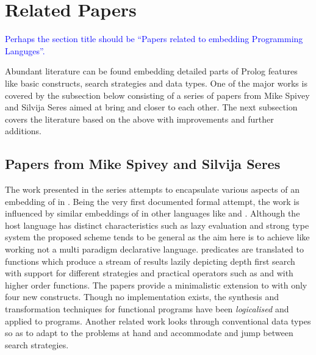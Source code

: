\documentclass[thesis-solanki.tex]{subfiles}
\begin{document}
\section{Related Papers}
\textcolor{blue}{Perhaps the section title should be ``Papers related to embedding Programming Languges''.}

Abundant literature
can be found  embedding detailed parts of Prolog features
like basic constructs, search strategies and data types.
One of the major works is covered by the subsection below consisting of a series of papers from Mike Spivey and
Silvija Seres aimed at bring  and  closer to each other.
The next subsection covers the literature based on the above
with improvements and further additions.


\subsection{Papers from Mike Spivey and Silvija Seres}


The work presented in the series
\cite{spivey1999embedding,seres1999algebra,seres2001higher,spivey1999algebra,seres2001algebra} attempts to
encapsulate various aspects of an embedding of  in .
Being the very first documented formal attempt, the work is influenced by similar embeddings of 
in other languages like  and .
Although the host language has distinct characteristics such as lazy evaluation and strong type system the proposed
scheme tends to be general as the aim here is to achieve
 like working not a multi paradigm
declarative language.
 predicates are translated to  functions which produce a stream of results
lazily depicting depth first search with support for different strategies and practical operators such as
 and  with higher order functions.
The papers provide a minimalistic extension to  with only four new constructs.
Though no implementation exists, the synthesis and transformation techniques for functional programs have been
\textit{logicalised} and applied to  programs.
Another related work \cite{spivey2000functional} looks through conventional data types so as to adapt to the
problems at hand and accommodate and jump between search strategies.
\end{document}
